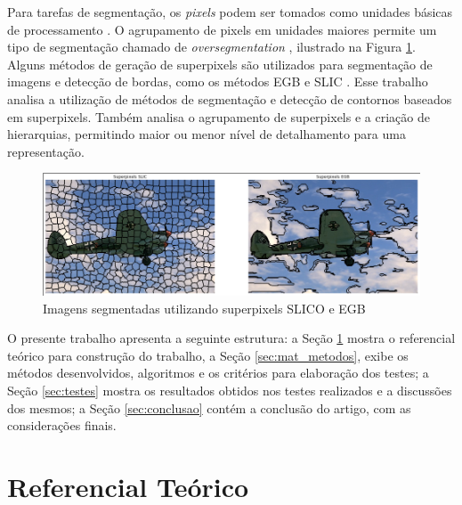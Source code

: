 \begin{document}
Para tarefas de segmentação, os \textit{pixels} podem ser tomados como unidades básicas de processamento \cite{WANG201728}. O agrupamento de pixels em unidades maiores permite um tipo de segmentação chamado de \textit{oversegmentation} \cite{WANG201728}, ilustrado na Figura \ref{fig:superpixel}. Alguns métodos de geração de superpixels são utilizados para segmentação de imagens e detecção de bordas, como os métodos EGB \cite{FELZENSZWALB} e SLIC \cite{SLIC}. Esse trabalho analisa a utilização de métodos de segmentação e detecção de contornos baseados em superpixels. Também analisa o agrupamento de superpixels e a criação de hierarquias, permitindo maior ou menor nível de detalhamento para uma representação.

\begin{figure}[ht]
\centering
\includegraphics[width=1.\textwidth]{superpixels.png}
\caption{Imagens segmentadas utilizando superpixels SLICO e EGB}
\label{fig:superpixel}
\end{figure}

O presente trabalho apresenta a seguinte estrutura: a Seção \ref{sec:ref_teorico} mostra o referencial teórico para construção do trabalho, a Seção \ref{sec:mat_metodos}, exibe os métodos desenvolvidos, algoritmos e os critérios para elaboração dos testes; a Seção \ref{sec:testes} mostra os resultados obtidos nos testes realizados e a discussões dos mesmos; a Seção \ref{sec:conclusao} contém a conclusão do artigo, com as considerações finais.



\section{Referencial Teórico} \label{sec:ref_teorico}

\end{document}
